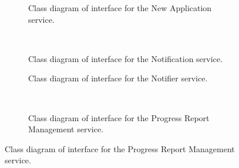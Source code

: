 \documentclass[12pt]{article}
\begin{document}
\begin{figure}[H]
\begin{subfigure}[H]{0.47\textwidth}
\centering	
{}
\caption{Class diagram of interface for the New Application service.}
\end{subfigure}
~
\begin{subfigure}[H]{0.47\textwidth}
\centering	
{}
\caption{Class diagram of interface for the Notification service.}
\end{subfigure}


\begin{subfigure}[H]{0.47\textwidth}
\centering	
{}
\caption{Class diagram of interface for the Notifier service.}
\end{subfigure}
~
\begin{subfigure}[H]{0.47\textwidth}
\centering	
{}
\caption{Class diagram of interface for the Progress Report Management service.}
\end{subfigure}
\end{figure}
\end{document}
